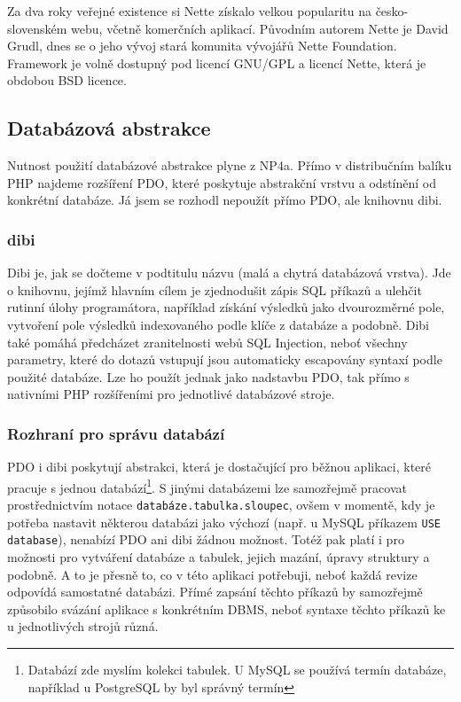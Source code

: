 \documentclass[11pt,twoside,a4paper]{book}
\begin{document}
Za dva roky veřejné existence si Nette získalo velkou popularitu na česko-slovenském webu, včetně komerčních aplikací. Původním autorem Nette je David Grudl, dnes se o jeho vývoj stará komunita vývojářů Nette Foundation. Framework je volně dostupný pod licencí GNU/GPL a licencí Nette, která je obdobou BSD licence\cite{nette:licence}.

\subsection{Databázová abstrakce}
Nutnost použití databázové abstrakce plyne z NP4a. Přímo v distribučním balíku PHP najdeme rozšíření PDO, které poskytuje abstrakční vrstvu a odstínění od konkrétní databáze. Já jsem se rozhodl nepoužít přímo PDO, ale knihovnu dibi.
\subsubsection{dibi}
Dibi je, jak se dočteme v podtitulu názvu  (malá a chytrá databázová vrstva). Jde o knihovnu, jejímž hlavním cílem je zjednodušit zápis SQL příkazů a ulehčit rutinní úlohy programátora, například získání výsledků jako dvourozměrné pole, vytvoření pole výsledků indexovaného podle klíče z databáze a podobně. Dibi také pomáhá předcházet zranitelnosti webů SQL Injection, neboť všechny parametry, které do dotazů vstupují jsou automaticky escapovány syntaxí podle použité databáze. Lze ho použít jednak jako nadstavbu PDO, tak přímo s nativními PHP rozšířeními pro jednotlivé databázové stroje.

\subsubsection{Rozhraní pro správu databází}
PDO i dibi poskytují abstrakci, která je dostačující pro běžnou aplikaci, které pracuje s jednou databází\footnote{Databází zde myslím kolekci tabulek. U MySQL se používá termín databáze, například u PostgreSQL by byl správný termín }. S jinými databázemi lze samozřejmě pracovat prostřednictvím  notace {\tt databáze.tabulka.sloupec}, ovšem v momentě, kdy je potřeba nastavit některou databázi jako výchozí (např. u MySQL příkazem {\tt USE database}), nenabízí PDO ani dibi žádnou možnost. Totéž pak platí i pro možnosti pro vytváření databáze a tabulek, jejich mazání, úpravy struktury a podobně.  A to je přesně to, co v této aplikaci potřebuji, neboť každá revize odpovídá samostatné databázi. Přímé zapsání těchto příkazů by samozřejmě způsobilo svázání aplikace s konkrétním DBMS, neboť syntaxe těchto příkazů ke u jednotlivých strojů různá.
\end{document}
